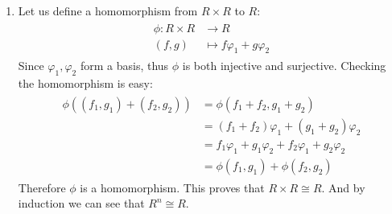 \begin{enumerate}[label=\ilabel]
    \item
        Let us define a homomorphism from $R \times R$ to $R$:
        \begin{gather*}
            \begin{split}
                \phi: R \times R & \to R \\
                (f, g) & \mapsto f \varphi_1 + g \varphi_2
            \end{split}
        \end{gather*}
        Since $\varphi_1, \varphi_2$ form a basis, thus $\phi$ is both injective and surjective.
        Checking the homomorphism is easy:
        \begin{gather*}
            \begin{split}
                \phi((f_1, g_1) + (f_2, g_2)) & = \phi(f_1 + f_2, g_1 + g_2) \\
                & = (f_1 + f_2) \varphi_1 + (g_1 + g_2) \varphi_2 \\
                & = f_1 \varphi_1 + g_1 \varphi_2 + f_2 \varphi_1 + g_2 \varphi_2 \\
                & = \phi(f_1, g_1) + \phi(f_2, g_2)
            \end{split}
        \end{gather*}
        Therefore $\phi$ is a homomorphism. This proves that $R \times R \cong R$. And by induction we can see that $R^n \cong R$.
\end{enumerate}